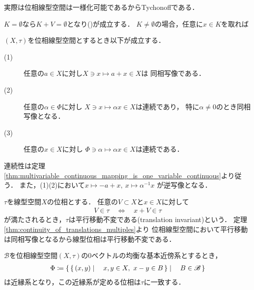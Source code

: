 	実際は位相線型空間は一様化可能であるからTychonoffである．
	
	\begin{prf}
		$K = \emptyset$なら$K + V = \emptyset$となり()が成立する．
		$K \neq \emptyset$の場合，任意に$x \in K$を取れば
	\end{prf}
	
	\begin{screen}
		\begin{thm}\label{thm:continuity_of_translations_multiples}
			$(X,\tau)$を位相線型空間とするとき以下が成立する．
			\begin{description}
				\item[(1)] 任意の$a \in X$に対し$X \ni x \longmapsto a + x \in X$は
					同相写像である．
					
				\item[(2)] 任意の$\alpha \in \Phi$に対し
					$X \ni x \longmapsto \alpha x \in X$は連続であり，
					特に$\alpha \neq 0$のとき同相写像となる．
					
				\item[(3)] 任意の$x \in X$に対し
					$\Phi \ni \alpha \longmapsto \alpha x \in X$は連続である．
			\end{description}
		\end{thm}
	\end{screen}
	
	\begin{prf}
		連続性は定理\ref{thm:multivariable_continuous_mapping_is_one_variable_continuous}より従う．
		また，(1)(2)において$x \longmapsto -a+x,\ x \longmapsto \alpha^{-1}x$
		が逆写像となる．
		\QED
	\end{prf}
	
	\begin{screen}
		\begin{thm}[平行移動不変位相]
			$\tau$を線型空間$X$の位相とする．
			任意の$V \subset X$と$x \in X$に対して
			\begin{align}
				V \in \tau \quad \Longleftrightarrow \quad
				x + V \in \tau
			\end{align}
			が満たされるとき，$\tau$は平行移動不変である(translation invariant)という．
			定理\ref{thm:continuity_of_translations_multiples}より
			位相線型空間において平行移動は同相写像となるから線型位相は平行移動不変である．
		\end{thm}
	\end{screen}
	
	\begin{screen}
		\begin{thm}[位相線型空間は一様空間]
			$\mathscr{B}$を位相線型空間$(X,\tau)$の0ベクトルの均衡な基本近傍系とするとき，
			\begin{align}
				\Phi \coloneqq
				\left\{\, \left\{\, (x,y) \mid \quad x,y \in X,\ x-y \in B\, \right\} \mid \quad B \in \mathscr{B}\, \right\}
			\end{align}
			は近縁系となり，この近縁系が定める位相は$\tau$に一致する．
		\end{thm}
	\end{screen}
	
